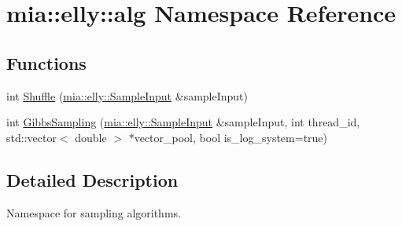 \hypertarget{namespacemia_1_1elly_1_1alg}{\section{mia\-:\-:elly\-:\-:alg Namespace Reference}
\label{namespacemia_1_1elly_1_1alg}
}
\subsection*{Functions}
\begin{DoxyCompactItemize}
\item 
int \hyperlink{namespacemia_1_1elly_1_1alg_ab8c9dff4bb66e3a9615525662a8f4af0}{Shuffle} (\hyperlink{classmia_1_1elly_1_1_sample_input}{mia\-::elly\-::\-Sample\-Input} \&sample\-Input)
\item 
int \hyperlink{namespacemia_1_1elly_1_1alg_a19a80aed51e58ec0661bd869af34c7d6}{Gibbs\-Sampling} (\hyperlink{classmia_1_1elly_1_1_sample_input}{mia\-::elly\-::\-Sample\-Input} \&sample\-Input, int thread\-\_\-id, std\-::vector$<$ double $>$ $\ast$vector\-\_\-pool, bool is\-\_\-log\-\_\-system=true)
\end{DoxyCompactItemize}


\subsection{Detailed Description}
Namespace for sampling algorithms. 


